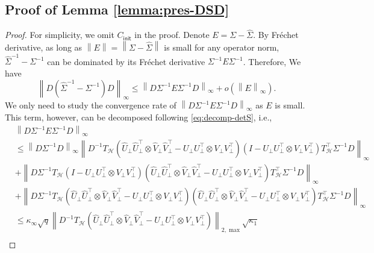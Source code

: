 \documentclass[12pt]{article}
\newcommand{\norm}[1]{\left\lVert#1\right\rVert}
\def\calH{{\mathcal H}}
\newcommand{\init}{{\mathsf{init}}}
\theoremstyle{plain}
\begin{document}
\subsection{Proof of Lemma \ref{lemma:pres-DSD} }
\begin{proof}
For simplicity, we omit $C_{\init}$ in the proof. Denote $E=\Sigma-\widehat{\Sigma}$. By Fréchet derivative, as long as $\norm{E}=\norm{\Sigma-\widehat{\Sigma}}$ is small for any operator norm,  $\widehat{\Sigma}^{-1}-{\Sigma}^{-1}$ can be dominated by its Fréchet derivative ${\Sigma}^{-1}E{\Sigma}^{-1}$. Therefore, We have
\begin{equation*}
            \norm{{D} (\widehat{\Sigma}^{-1}-{\Sigma}^{-1}) {D}}_{\infty}\le \norm{{D}{\Sigma}^{-1}E{\Sigma}^{-1}{D}}_\infty+o(\norm{E}_\infty).
\end{equation*}
We only need to study the convergence rate of $\norm{{D}{\Sigma}^{-1}E{\Sigma}^{-1}{D}}_\infty$ as $E$ is small. This term, however, can be decomposed following \eqref{eq:decomp-detS}, i.e.,
\begin{equation*}
    \begin{aligned}
     & \norm{{D}{\Sigma}^{-1}E{\Sigma}^{-1}{D}}_\infty \\
       & \le  \norm{{D}{\Sigma}^{-1}D}_\infty \norm{D^{-1}
       T_{\calH}\left(\widehat U_\perp \widehat U_\perp^\top \otimes \widehat V_\perp \widehat V_\perp^\top - U_\perp U_\perp^\top \otimes V_\perp V_\perp^\top\right) \left(I-U_\perp U_\perp^\top \otimes V_\perp V_\perp^\top\right) T_{\calH}^\top {\Sigma}^{-1}{D}
       }_{\infty}\\
     & + 
     \norm{{D}{\Sigma}^{-1} T_{\calH}\left(I-U_\perp U_\perp^\top \otimes V_\perp V_\perp^\top\right)\left(\widehat U_\perp \widehat U_\perp^\top \otimes \widehat V_\perp \widehat V_\perp^\top - U_\perp U_\perp^\top \otimes V_\perp V_\perp^\top \right) T_{\calH}^\top {\Sigma}^{-1}{D}
     }_\infty
     \\
     & + \norm{{D}{\Sigma}^{-1}T_{\calH}\left(\widehat U_\perp \widehat U_\perp^\top \otimes \widehat V_\perp \widehat V_\perp^\top - U_\perp U_\perp^\top \otimes V_\perp V_\perp^\top\right) \left(\widehat U_\perp \widehat U_\perp^\top \otimes \widehat V_\perp \widehat V_\perp^\top - U_\perp U_\perp^\top \otimes V_\perp V_\perp^\top\right) T_{\calH}^\top{\Sigma}^{-1}{D}}_\infty \\
     & \le \kappa_\infty \sqrt{q} \norm{ D^{-1}T_{\calH}\left(\widehat U_\perp \widehat U_\perp^\top \otimes \widehat V_\perp \widehat V_\perp^\top - U_\perp U_\perp^\top \otimes V_\perp V_\perp^\top\right) }_{2,\max} \sqrt{\kappa_1} \\

\end{aligned}
\end{equation*}
\end{proof}
\end{document}
